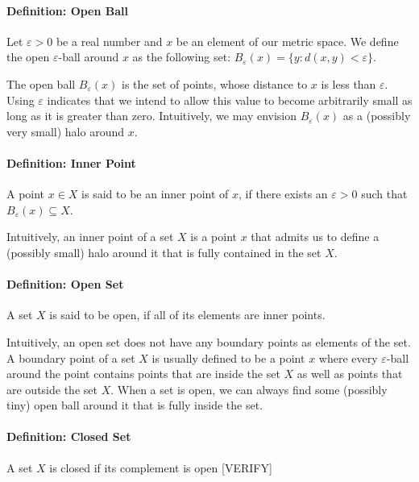 
\paragraph{Definition: Open Ball} Let $\varepsilon > 0$ be a real number and $x$ be an element of our metric space.  We define the open $\varepsilon$-ball around $x$ as the following set: $B_\varepsilon(x) = \{ y : d(x,y) < \varepsilon \}$.

\medskip
The open ball $B_\varepsilon(x)$ is the set of points, whose distance to $x$ is less than $\varepsilon$. Using $\varepsilon$ indicates that we intend to allow this value to become arbitrarily small as long as it is greater than zero. Intuitively, we may envision $B_\varepsilon(x)$ as a (possibly very small) halo around $x$.

\paragraph{Definition: Inner Point} A point $x \in X$ is said to be an inner point of $x$, if there exists an $\varepsilon > 0$ such that $B_\varepsilon(x) \subseteq X$. 

\medskip
Intuitively, an inner point of a set $X$ is a point $x$ that admits us to define a (possibly small) halo around it that is fully contained in the set $X$.

\paragraph{Definition: Open Set} A set $X$ is said to be open, if all of its elements are inner points. 

\medskip
Intuitively, an open set does not have any boundary points as elements of the set. A boundary point of a set $X$ is usually defined to be a point $x$ where every $\varepsilon$-ball around the point contains points that are inside the set $X$ as well as points that are outside the set $X$. When a set is open, we can always find some (possibly tiny) open ball around it that is fully inside the set.

\paragraph{Definition: Closed Set} A set $X$ is closed if its complement is open [VERIFY]


